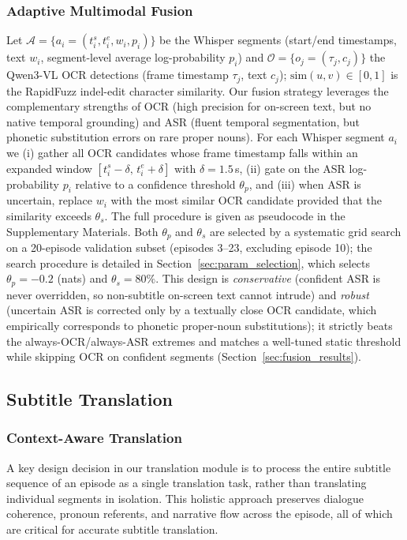 \documentclass[mathematics,article,submit,xetex,moreauthors]{Definitions/mdpi}
\begin{document}
\subsubsection{Adaptive Multimodal Fusion}
\label{sec:fusion}
Let $\mathcal{A}=\{a_i=(t_i^s,t_i^e,w_i,p_i)\}$ be the Whisper segments (start/end timestamps, text $w_i$, segment-level average log-probability $p_i$) and $\mathcal{O}=\{o_j=(\tau_j,c_j)\}$ the Qwen3-VL OCR detections (frame timestamp $\tau_j$, text $c_j$); $\mathrm{sim}(u,v)\in[0,1]$ is the RapidFuzz indel-edit character similarity.
Our fusion strategy leverages the complementary strengths of OCR (high precision for on-screen text, but no native temporal grounding) and ASR (fluent temporal segmentation, but phonetic substitution errors on rare proper nouns).
For each Whisper segment $a_i$ we (i) gather all OCR candidates whose frame timestamp falls within an expanded window $[t_i^s - \delta,\, t_i^e + \delta]$ with $\delta = 1.5$\,s, (ii) gate on the ASR log-probability $p_i$ relative to a confidence threshold $\theta_p$, and (iii) when ASR is uncertain, replace $w_i$ with the most similar OCR candidate provided that the similarity exceeds $\theta_s$.
The full procedure is given as pseudocode in the Supplementary Materials.
Both $\theta_p$ and $\theta_s$ are selected by a systematic grid search on a 20-episode validation subset (episodes 3--23, excluding episode 10); the search procedure is detailed in Section~\ref{sec:param_selection}, which selects $\theta_p = -0.2$ (nats) and $\theta_s = 80\%$.
This design is \emph{conservative} (confident ASR is never overridden, so non-subtitle on-screen text cannot intrude) and \emph{robust} (uncertain ASR is corrected only by a textually close OCR candidate, which empirically corresponds to phonetic proper-noun substitutions); it strictly beats the always-OCR/always-ASR extremes and matches a well-tuned static threshold while skipping OCR on confident segments (Section~\ref{sec:fusion_results}).

\subsection{Subtitle Translation}
\label{sec:translation}

\subsubsection{Context-Aware Translation}
A key design decision in our translation module is to process the entire subtitle sequence of an episode as a single translation task, rather than translating individual segments in isolation.
This holistic approach preserves dialogue coherence, pronoun referents, and narrative flow across the episode, all of which are critical for accurate subtitle translation.
\end{document}
